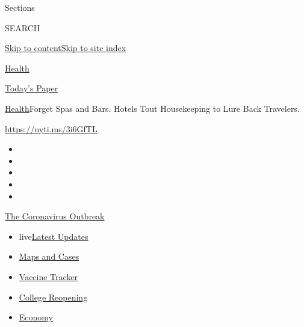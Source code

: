 Sections

SEARCH

\protect\hyperlink{site-content}{Skip to
content}\protect\hyperlink{site-index}{Skip to site index}

\href{https://www.nytimes.com/section/health}{Health}

\href{https://myaccount.nytimes.com/auth/login?response_type=cookie\&client_id=vi}{}

\href{https://www.nytimes.com/section/todayspaper}{Today's Paper}

\href{/section/health}{Health}\textbar{}Forget Spas and Bars. Hotels
Tout Housekeeping to Lure Back Travelers.

\url{https://nyti.ms/3i6GfTL}

\begin{itemize}
\item
\item
\item
\item
\item
\end{itemize}

\href{https://www.nytimes.com/news-event/coronavirus?action=click\&pgtype=Article\&state=default\&region=TOP_BANNER\&context=storylines_menu}{The
Coronavirus Outbreak}

\begin{itemize}
\tightlist
\item
  live\href{https://www.nytimes.com/2020/08/04/world/coronavirus-cases.html?action=click\&pgtype=Article\&state=default\&region=TOP_BANNER\&context=storylines_menu}{Latest
  Updates}
\item
  \href{https://www.nytimes.com/interactive/2020/us/coronavirus-us-cases.html?action=click\&pgtype=Article\&state=default\&region=TOP_BANNER\&context=storylines_menu}{Maps
  and Cases}
\item
  \href{https://www.nytimes.com/interactive/2020/science/coronavirus-vaccine-tracker.html?action=click\&pgtype=Article\&state=default\&region=TOP_BANNER\&context=storylines_menu}{Vaccine
  Tracker}
\item
  \href{https://www.nytimes.com/2020/08/02/us/covid-college-reopening.html?action=click\&pgtype=Article\&state=default\&region=TOP_BANNER\&context=storylines_menu}{College
  Reopening}
\item
  \href{https://www.nytimes.com/live/2020/08/04/business/stock-market-today-coronavirus?action=click\&pgtype=Article\&state=default\&region=TOP_BANNER\&context=storylines_menu}{Economy}
\end{itemize}

